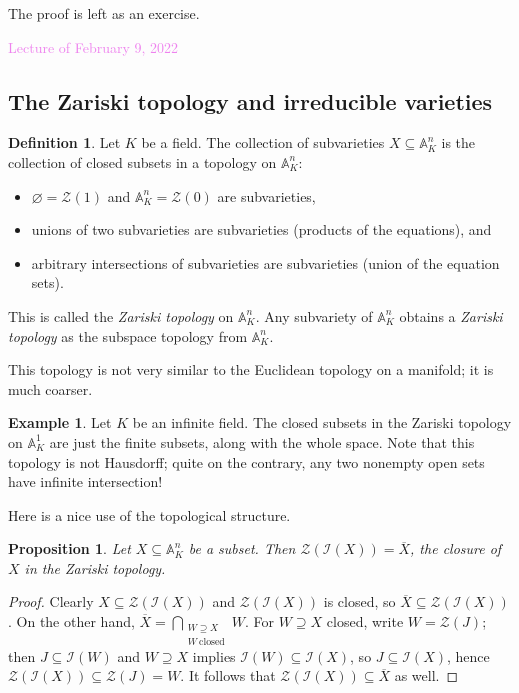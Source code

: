 \documentclass{amsart}[12pt]
\def\image{\operatorname{im}}
\def\im{\image}
\def\ker{\operatorname{ker}}
\newcommand{\Feb}[1]{\textcolor{violet}{Lecture of February #1, 2022}}
\newcommand{\A}{\mathbb{A}}
\newcommand{\cZ}{\mathcal{Z}}
\newcommand{\cI}{\mathcal{I}}
\newcommand{\DEF}[1]{\emph{#1}\index{#1}}
\numberwithin{equation}{section}
\theoremstyle{plain} %
\newtheorem{prop}[equation]{Proposition}
\theoremstyle{definition}
\newtheorem{defn}[equation]{Definition}
\newtheorem{ex}[equation]{Example}
\theoremstyle{remark}
\newcommand{\ssec}[1]{\subsection{#1}}
\newcommand{\xra}[1]{\xrightarrow{#1}}
\begin{document}

The proof is left as an exercise.

\Feb{9}

\ssec{The Zariski topology and irreducible varieties}

\begin{defn} Let $K$ be a field. The collection of subvarieties $X\subseteq \A^n_K$ is the collection of closed subsets in a topology on $\A^n_K$:
\begin{itemize}
\item $\varnothing = \cZ(1)$ and $\A^n_K = \cZ(0)$ are subvarieties,
\item unions of two subvarieties are subvarieties (products of the equations), and
\item arbitrary intersections of subvarieties are subvarieties (union of the equation sets).
\end{itemize}
This is called the \DEF{Zariski topology} on $\A^n_K$. Any subvariety of $\A^n_K$ obtains a \emph{Zariski topology} as the subspace topology from $\A^n_K$.
\end{defn}

This topology is not very similar to the Euclidean topology on a manifold; it is much coarser.

\begin{ex} Let $K$ be an infinite field. The closed subsets in the Zariski topology on $\A^1_K$ are just the finite subsets, along with the whole space. Note that this topology is not Hausdorff; quite on the contrary, any two nonempty open sets have infinite intersection!
\end{ex}

Here is a nice use of the topological structure.

\begin{prop} Let $X\subseteq \A^n_K$ be a subset. Then $\cZ(\cI(X)) = \overline{X}$, the closure of $X$ in the Zariski topology.
\end{prop}
\begin{proof} Clearly $X \subseteq \cZ(\cI(X))$ and $\cZ(\cI(X))$ is closed, so $\overline{X} \subseteq \cZ(\cI(X))$. 
On the other hand, $\displaystyle \overline{X} = \bigcap_{\substack{W \supseteq X \\ W \ \mathrm{closed} }} W$.  For $W\supseteq X$ closed, write $W=\cZ(J)$; then $J\subseteq \cI(W)$ and $W \supseteq X$ implies $\cI(W) \subseteq \cI(X)$, so $J\subseteq \cI(X)$, hence $\cZ(\cI(X)) \subseteq \cZ(J) = W$. It follows that $\cZ(\cI(X)) \subseteq \overline{X}$ as well.
\end{proof}
\end{document}
